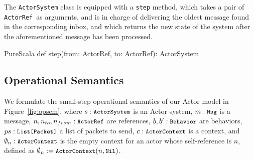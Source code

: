 \documentclass[a4paper,twoside]{article}
\newcommand{\InlineS}[1]{\lstinline[language=PureScala,basicstyle=\small\ttfamily,columns=fixed]|#1|}
\newcommand{\RefFig}[1]{Figure~\ref{#1}}
\newcommand{\ActorRef}{\InlineS{ActorRef}\ }
\newcommand{\stt}[1]{\texttt{\small{#1}}}
\begin{document}
The \InlineS{ActorSystem} class is equipped with a \InlineS{step} method, which takes 
a pair of \ActorRef as arguments, and is in charge of delivering the oldest message 
found in the corresponding inbox, and which returns the new state of the system after 
the aforementioned message has been processed.

\begin{ShortCode}{PureScala}
def step(from: ActorRef, to: ActorRef): ActorSystem
\end{ShortCode}

\subsection{Operational Semantics}
\label{semantics}

We formulate the small-step operational semantics of our Actor model in 
\RefFig{fig:opsem}, where $s: \stt{ActorSystem}$ is an Actor system,
$m: \stt{Msg}$ is a message,
$n, n_{to}, n_{from}: \stt{ActorRef}$ are references,
$b, b': \stt{Behavior}$ are behaviors,
$ps: \stt{List[Packet]}$ a list of packets to send,
$c: \stt{ActorContext}$ is a context,
and $\emptyset_n: \stt{ActorContext}$ is the empty context for an actor whose
self-reference is $n$, defined as $\emptyset_n := \stt{ActorContext}(n, \stt{Nil})$.
\end{document}
